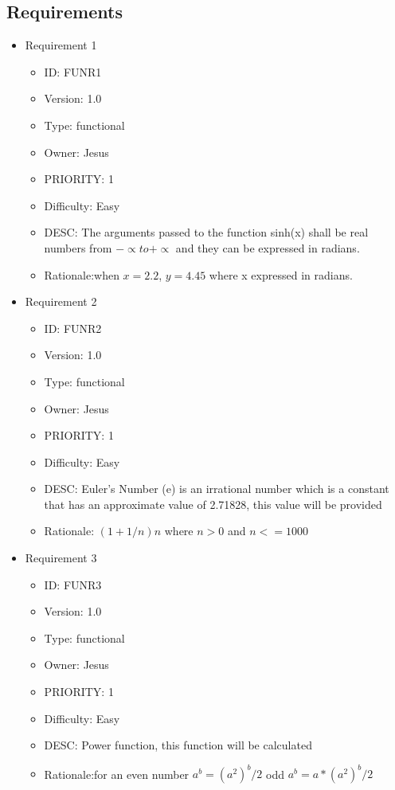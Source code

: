 \documentclass[12pt]{report}
\begin{document}
\pagebreak
\subsection{Requirements}

\begin{itemize}
\item Requirement 1
\begin{itemize}
\item ID:       FUNR1
\item Version:  1.0
\item Type:     functional
\item Owner:    Jesus
\item PRIORITY: 1 
\item Difficulty: Easy
\item DESC: The arguments passed to the function sinh(x) shall be real numbers from $-\propto to +\propto$ and they can be expressed in radians.
\item Rationale:when $x=2.2$, $ y = 4.45$ where x expressed in radians.
\end{itemize}
\item Requirement 2
\begin{itemize}
\item ID:       FUNR2
\item Version:  1.0
\item Type:     functional
\item Owner:    Jesus
\item PRIORITY: 1 
\item Difficulty: Easy
\item DESC: Euler's Number (e) is an irrational number which is a constant that has an approximate value of 2.71828, this value will be provided
\item Rationale: $(1 + 1/n)n$ where $n>0 $ and $n<=1000$
\end{itemize}
\pagebreak
\item Requirement 3
\begin{itemize}
\item ID:       FUNR3
\item Version:  1.0
\item Type:     functional
\item Owner:    Jesus
\item PRIORITY: 1 
\item Difficulty: Easy
\item DESC: Power function, this function will be calculated
\item Rationale:for an even number $a^{b}= (a^2)^b/2$  odd $a^{b}=a*(a^2)^b/2$

\end{itemize}
\end{itemize}
\end{document}
